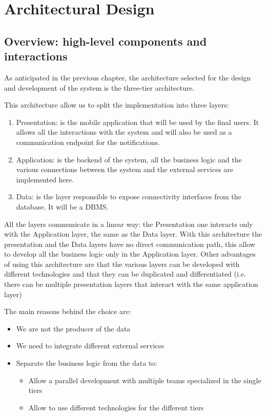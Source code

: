 \chapter{Architectural Design}
\section{Overview: high-level components and interactions}

As anticipated in the previous chapter, the architecture selected for the design and development of the system is the three-tier architecture.

This architecture allow us to split the implementation into three layers:
\begin{enumerate}
	\item Presentation: is the mobile application that will be used by the final users. It allows all the interactions with the system and will also be used as a communication endpoint for the notifications.
	\item Application: is the backend of the system, all the business logic and the various connections between the system and the external services are implemented here.
	\item Data: is the layer responsible to expose connectivity interfaces from the database. It will be a DBMS.
\end{enumerate}
All the layers communicate in a linear way: the Presentation one interacts only with the Application layer, the same as the Data layer. With this architecture the presentation and the Data layers have no direct communication path, this allow to develop all the business logic only in the Application layer.
Other advantages of using this architecture are that the various layers can be developed with different technologies and that they can be duplicated and differentiated (i.e. there can be multiple presentation layers that interact with the same application layer)

The main reasons behind the choice are:
\begin{itemize}
	\item We are not the producer of the data
	\item We need to integrate different external services
	\item Separate the business logic from the data to:
	\begin{itemize}
		\item Allow a parallel development with multiple teams specialized in the single tiers
		\item Allow to use different technologies for the different tiers
	\end{itemize}
\end{itemize}


